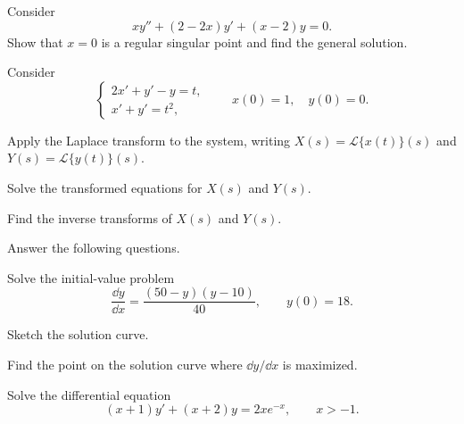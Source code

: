 \documentclass[11pt,oneside]{article}
\begin{document}
\begin{problem}
Consider
\[
xy''+(2-2x)y'+(x-2)y=0.
\]
Show that $x=0$ is a regular singular point and find the general solution.
\end{problem}

\begin{problem}
Consider
\[
\begin{cases}
2x'+y'-y=t,\\
x'+y'=t^2,
\end{cases}
\qquad x(0)=1,\quad y(0)=0.
\]
\begin{problemsubparts}
\item Apply the Laplace transform to the system, writing $X(s)=\mathcal L\{x(t)\}(s)$ and $Y(s)=\mathcal L\{y(t)\}(s)$.
\item Solve the transformed equations for $X(s)$ and $Y(s)$.
\item Find the inverse transforms of $X(s)$ and $Y(s)$.
\end{problemsubparts}
\end{problem}

\schoolsection{\KAIST}{\KoreaAdvancedInstituteOfScienceAndTechnology}

\begin{problem}
Answer the following questions.
\begin{problemsubparts}
\item Solve the initial-value problem
\[
\frac{\dd y}{\dd x}=\frac{(50-y)(y-10)}{40},
\qquad
y(0)=18.
\]
\item Sketch the solution curve.
\item Find the point on the solution curve where $\dd y/\dd x$ is maximized.
\end{problemsubparts}
\end{problem}

\begin{problem}
Solve the differential equation
\[
(x+1)y'+(x+2)y=2xe^{-x},
\qquad x>-1.
\]
\end{problem}
\end{document}
